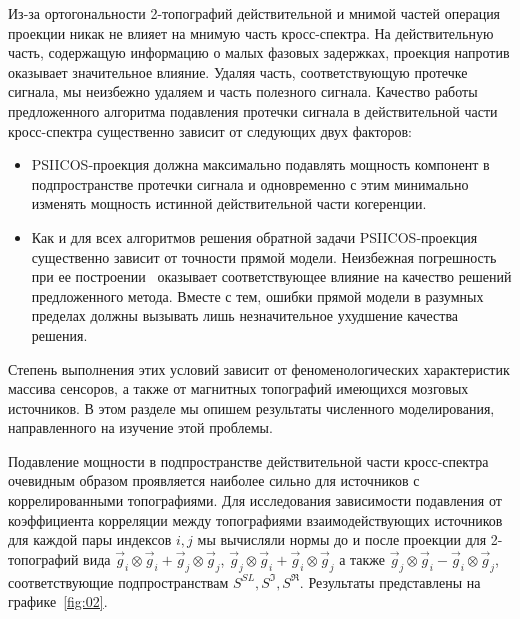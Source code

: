Из-за ортогональности 2-топографий действительной и мнимой частей операция
проекции никак не влияет на мнимую часть кросс-спектра. На действительную
часть, содержащую информацию о малых фазовых задержках, проекция напротив
оказывает значительное влияние.  Удаляя часть, соответствующую протечке
сигнала, мы неизбежно удаляем и часть полезного сигнала. Качество работы
предложенного алгоритма подавления протечки сигнала в действительной части
кросс-спектра существенно зависит от следующих двух факторов:

\begin{itemize}
    \item PSIICOS-проекция должна максимально подавлять мощность компонент в
        подпространстве протечки сигнала и одновременно с этим минимально
        изменять мощность истинной действительной части когеренции.
    \item Как и для всех алгоритмов решения обратной задачи PSIICOS-проекция
        существенно зависит от точности прямой модели. Неизбежная погрешность
        при ее построении~\cite{Mosher1999} оказывает соответствующее влияние
        на качество решений предложенного метода. Вместе с тем, ошибки прямой
        модели в разумных пределах должны вызывать лишь незначительное
        ухудшение качества решения.
\end{itemize}

Степень выполнения этих условий зависит от феноменологических характеристик
массива сенсоров, а также от магнитных топографий имеющихся мозговых
источников. В этом разделе мы опишем результаты численного моделирования,
направленного на изучение этой проблемы.

Подавление мощности в подпространстве действительной части кросс-спектра
очевидным образом проявляется наиболее сильно для источников с коррелированными
топографиями.  Для исследования зависимости подавления от коэффициента
корреляции между топографиями взаимодействующих источников для каждой пары
индексов $i, j$ мы вычисляли нормы до и после проекции для 2-топографий вида
$\vec{g}_i \otimes \vec{g}_i + \vec{g}_j \otimes \vec{g}_j$,
$\vec{g}_j\otimes\vec{g}_i + \vec{g}_i\otimes\vec{g}_j$ а также
$\vec{g}_j\otimes\vec{g}_i - \vec{g}_i\otimes\vec{g}_j$, соответствующие
подпространствам $S^{SL}, S^{\Im}, S^{\Re}$. Результаты представлены на графике~\ref{fig:02}.

